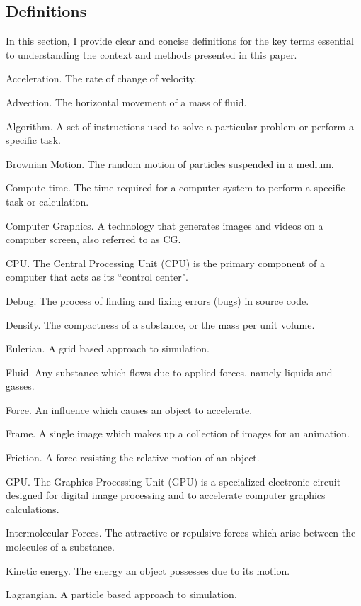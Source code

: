 \documentclass[write-up.tex]{subfiles}
\begin{document}
\subsection{Definitions}
In this section, I provide clear and concise definitions for the key terms essential to understanding the context and methods presented in this paper.
\begin{worddefs}
\item[Acceleration.] The rate of change of velocity.
\item[Advection.] The horizontal movement of a mass of fluid.
\item [Algorithm.] A set of instructions used to solve a particular problem or perform a specific task.
\item[Brownian Motion.] The random motion of particles suspended in a medium.
\item[Compute time.] The time required for a computer system to perform a specific task or calculation.
 \item [Computer Graphics.] A technology that generates images and videos on a computer screen, also referred to as CG.
\item[CPU.] The Central Processing Unit (CPU) is the primary component of a computer that acts as its “control center".
\item [Debug.] The process of finding and fixing errors (bugs) in source code.
\item[Density.] The compactness of a substance, or the mass per unit volume.
\item[Eulerian.] A grid based approach to simulation.
 \item [Fluid.] Any substance which flows due to applied forces, namely liquids and gasses.
 \item[Force.] An influence which causes an object to accelerate.
\item [Frame.] A single image which makes up a collection of images for an animation.
\item[Friction.] A force resisting the relative motion of an object.
\item[GPU.] The Graphics Processing Unit (GPU) is a specialized electronic circuit  designed for digital image processing and to accelerate computer graphics calculations.
\item[Intermolecular Forces.] The attractive or repulsive forces which arise between the molecules of a substance.
\item[Kinetic energy.] The energy an object possesses due to its motion.
\item [Lagrangian.] A particle based approach to simulation.

\end{worddefs}
\end{document}
